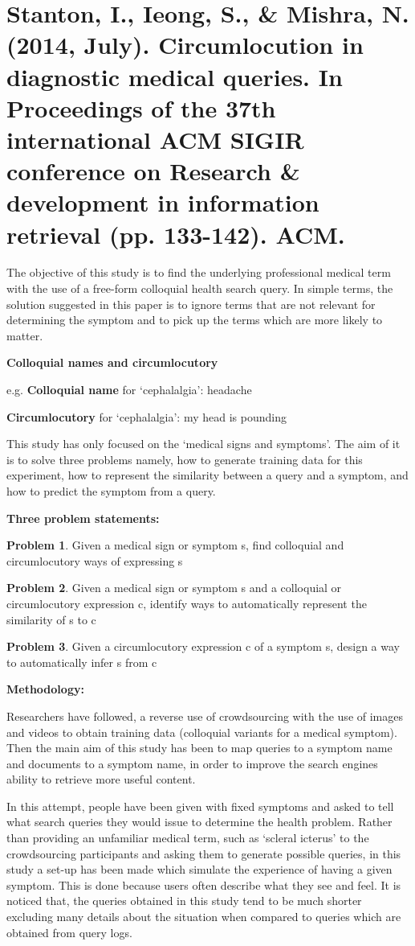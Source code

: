 \documentclass[]{article}
\begin{document}
\section{Stanton, I., Ieong, S., & Mishra, N. (2014, July). Circumlocution in diagnostic medical queries. In Proceedings of the 37th international ACM SIGIR conference on Research & development in information retrieval (pp. 133-142). ACM.}


The objective of this study is to find the underlying professional medical term with the use of a free-form colloquial health search query. In simple terms, the solution suggested in this paper is to ignore terms that are not relevant for determining the symptom and to pick up the terms which are more likely to matter.

\textbf{Colloquial names and circumlocutory  }
 
e.g. \textbf{Colloquial name} for ‘cephalalgia’: headache

\textbf{Circumlocutory} for ‘cephalalgia’: my head is pounding

This study has only focused on the ‘medical signs and symptoms’. The aim of it is to solve three problems namely, how to generate training data for this experiment, how to represent the similarity between a query and a symptom, and how to predict the symptom from a query. 
 
\textbf{Three problem statements:}

\textbf{Problem 1}. Given a medical sign or symptom s, find colloquial and circumlocutory ways of expressing s

\textbf{Problem 2}. Given a medical sign or symptom s and a colloquial or circumlocutory expression c, identify ways to automatically represent the similarity of s to c

\textbf{Problem 3}. Given a circumlocutory expression c of a symptom s, design a way to automatically infer s from c  

\textbf{Methodology:} 

Researchers have followed, a reverse use of crowdsourcing with the use of images and videos to obtain training data (colloquial variants for a medical symptom). Then the main aim of this study has been to map queries to a symptom name and documents to a symptom name, in order to improve the search engines ability to retrieve more useful content. 

In this attempt, people have been given with fixed symptoms and asked to tell what search queries they would issue to determine the health problem. Rather than providing an unfamiliar medical term, such as ‘scleral icterus’ to the crowdsourcing participants and asking them to generate possible queries, in this study a set-up has been made which simulate the experience of having a given symptom. This is done because users often describe what they see and feel. It is noticed that, the queries obtained in this study tend to be much shorter excluding many details about the situation when compared to queries which are obtained from query logs. 
\end{document}
